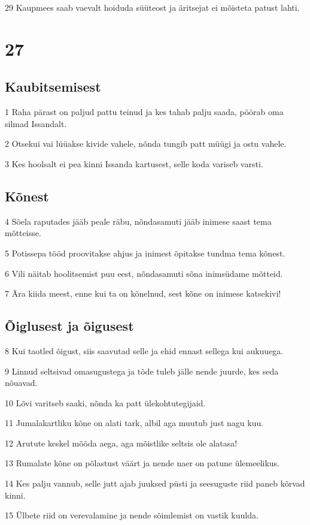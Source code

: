 \par 29 Kaupmees saab vaevalt hoiduda süüteost ja äritsejat ei mõisteta patust lahti.

\chapter{27}

\section*{Kaubitsemisest}

\par 1 Raha pärast on paljud pattu teinud ja kes tahab palju saada, pöörab oma silmad Issandalt.
\par 2 Otsekui vai lüüakse kivide vahele, nõnda tungib patt müügi ja ostu vahele.
\par 3 Kes hoolsalt ei pea kinni Issanda kartusest, selle koda variseb varsti.

\section*{Kõnest}

\par 4 Sõela raputades jääb peale räbu, nõndasamuti jääb inimese saast tema mõtteisse.
\par 5 Potissepa tööd proovitakse ahjus ja inimest õpitakse tundma tema kõnest.
\par 6 Vili näitab hoolitsemist puu eest, nõndasamuti sõna inimsüdame mõtteid.
\par 7 Ära kiida meest, enne kui ta on kõnelnud, sest kõne on inimese katsekivi!

\section*{Õiglusest ja õigusest}

\par 8 Kui taotled õigust, siis saavutad selle ja ehid ennast sellega kui aukuuega.
\par 9 Linnud seltsivad omasugustega ja tõde tuleb jälle nende juurde, kes seda nõuavad.
\par 10 Lõvi varitseb saaki, nõnda ka patt ülekohtutegijaid.
\par 11 Jumalakartliku kõne on alati tark, albil aga muutub just nagu kuu.
\par 12 Arutute keskel mõõda aega, aga mõistlike seltsis ole alatasa!
\par 13 Rumalate kõne on põlastust väärt ja nende naer on patune ülemeelikus.
\par 14 Kes palju vannub, selle jutt ajab juuksed püsti ja seesuguste riid paneb kõrvad kinni.
\par 15 Ülbete riid on verevalamine ja nende sõimlemist on vastik kuulda.

